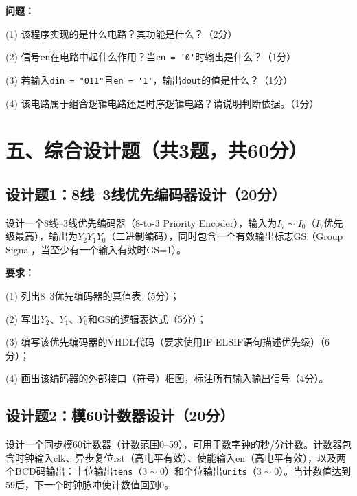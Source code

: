 \vspace{0.3cm}

\textbf{问题：}

(1) 该程序实现的是什么电路？其功能是什么？（2分）

(2) 信号\verb|en|在电路中起什么作用？当\verb|en = '0'|时输出是什么？（1分）

(3) 若输入\verb|din = "011"|且\verb|en = '1'|，输出\verb|dout|的值是什么？（1分）

(4) 该电路属于组合逻辑电路还是时序逻辑电路？请说明判断依据。（1分）

\vspace{0.5cm}

\section{五、综合设计题（共3题，共60分）}

\subsection{设计题1：8线--3线优先编码器设计（20分）}

设计一个8线--3线优先编码器（8-to-3 Priority Encoder），输入为$I_7 \sim I_0$（$I_7$优先级最高），输出为$Y_2 Y_1 Y_0$（二进制编码），同时包含一个有效输出标志GS（Group Signal，当至少有一个输入有效时GS=1）。

\vspace{0.3cm}

\textbf{要求：}

(1) 列出8--3优先编码器的真值表（5分）；

(2) 写出$Y_2$、$Y_1$、$Y_0$和GS的逻辑表达式（5分）；

(3) 编写该优先编码器的VHDL代码（要求使用IF-ELSIF语句描述优先级）（6分）；

(4) 画出该编码器的外部接口（符号）框图，标注所有输入输出信号（4分）。

\vspace{0.5cm}

\subsection{设计题2：模60计数器设计（20分）}

设计一个同步模60计数器（计数范围0--59），可用于数字钟的秒/分计数。计数器包含时钟输入clk、异步复位rst（高电平有效）、使能输入en（高电平有效），以及两个BCD码输出：十位输出\verb|tens|（$3\sim0$）和个位输出\verb|units|（$3\sim0$）。当计数值达到59后，下一个时钟脉冲使计数值回到0。

